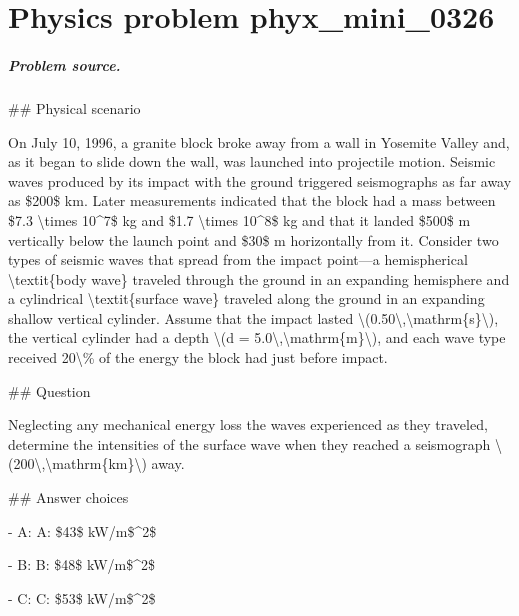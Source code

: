 
\chapter{Physics problem phyx\_mini\_0326}
\label{ch:PhyXMiniProblems_problem_phyx_mini_0326}

\paragraph{Problem source.}
\#\# Physical scenario

On July 10, 1996, a granite block broke away from a wall in Yosemite Valley and, as it began to slide down the wall, was launched into projectile motion. Seismic waves produced by its impact with the ground triggered seismographs as far away as \$200\$ km. Later measurements indicated that the block had a mass between \$7.3 \textbackslash{}times 10\textasciicircum{}7\$ kg and \$1.7 \textbackslash{}times 10\textasciicircum{}8\$ kg and that it landed \$500\$ m vertically below the launch point and \$30\$ m horizontally from it. Consider two types of seismic waves that spread from the impact point—a hemispherical \textbackslash{}textit\{body wave\} traveled through the ground in an expanding hemisphere and a cylindrical \textbackslash{}textit\{surface wave\} traveled along the ground in an expanding shallow vertical cylinder. Assume that the impact lasted \textbackslash{}(0.50\textbackslash{},\textbackslash{}mathrm\{s\}\textbackslash{}), the vertical cylinder had a depth \textbackslash{}(d = 5.0\textbackslash{},\textbackslash{}mathrm\{m\}\textbackslash{}), and each wave type received 20\textbackslash{}\% of the energy the block had just before impact.

\#\# Question

Neglecting any mechanical energy loss the waves experienced as they traveled, determine the intensities of the surface wave when they reached a seismograph \textbackslash{}(200\textbackslash{},\textbackslash{}mathrm\{km\}\textbackslash{}) away.

\#\# Answer choices

- A: A: \$43\$ kW/m\$\textasciicircum{}2\$

- B: B: \$48\$ kW/m\$\textasciicircum{}2\$

- C: C: \$53\$ kW/m\$\textasciicircum{}2\$

